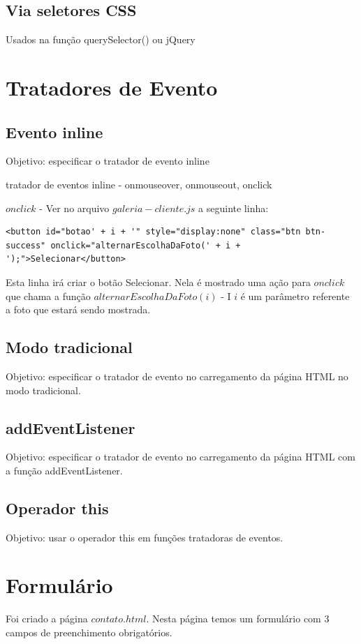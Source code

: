 \subsection{Via seletores CSS}
  Usados na função querySelector() ou jQuery
  
\section{Tratadores de Evento}
\subsection{Evento inline}
Objetivo: especificar o tratador de evento inline

tratador de eventos inline - onmouseover, onmouseout, onclick

$onclick$ - Ver no arquivo $galeria-cliente.js$ a seguinte linha:

\begin{lstlisting}
<button id="botao' + i + '" style="display:none" class="btn btn-success" onclick="alternarEscolhaDaFoto(' + i + ');">Selecionar</button>
\end{lstlisting}

	Esta linha irá criar o botão Selecionar. Nela é mostrado uma ação para $onclick$ que chama a função $alternarEscolhaDaFoto(i)$ - I $i$ é um parâmetro referente a foto que estará sendo mostrada.

\subsection{Modo tradicional}
Objetivo: especificar o tratador de evento no carregamento da página HTML no modo tradicional.


\subsection{addEventListener}
 Objetivo: especificar o tratador de evento no carregamento da página HTML com a função addEventListener.
 
\subsection{Operador this}
 Objetivo: usar o operador this em funções tratadoras de eventos.
 
 


\section{Formulário}
	Foi criado a página $contato.html$. Nesta página temos um formulário com $3$ campos de preenchimento obrigatórios.
	
